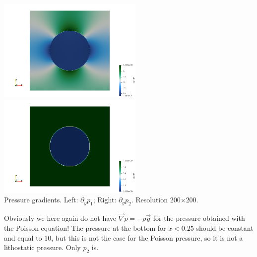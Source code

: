 \begin{center}
\includegraphics[width=7cm]{python_codes/fieldstone_119/results/exp4/dp1dy}
\includegraphics[width=7cm]{python_codes/fieldstone_119/results/exp4/dp2dy}\\
{\captionfont Pressure gradients. Left: $\partial_yp_1$; Right: $\partial_yp_2$. Resolution 200$\times$200.}
\end{center}

Obviously we here again do not have $\vec{\nabla}p=-\rho\vec{g}$ for the pressure obtained with 
the Poisson equation!
The pressure at the bottom for $x<0.25$ should be constant and equal to 10, but this is not 
the case for the Poisson pressure, so it is not a lithostatic pressure. Only $p_2$ is. 





